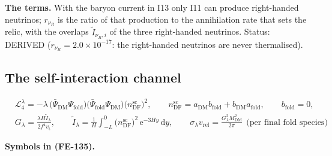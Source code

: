 \documentclass[
  10pt,
]{article}
\begin{document}
\textbf{The terms.} With the baryon current in I13 only I11 can produce
right-handed neutrinos; \(r_{\nu_R}\) is the ratio of that production to
the annihilation rate that sets the relic, with the overlaps
\(\tilde I_{\nu_R,i}\) of the three right-handed neutrinos. Status:
DERIVED (\(r_{\nu_R} = 2.0\times10^{-17}\): the right-handed neutrinos
are never thermalised).

\hypertarget{the-self-interaction-channel}{%
\subsection{The self-interaction
channel}\label{the-self-interaction-channel}}

\[
\begin{aligned}
&\mathcal{L}_4^{\lambda} =
 -\lambda\,\big(\bar\Psi_{\mathrm{DM}}\Psi_{\mathrm{fold}}\big)\big(\bar\Psi_{\mathrm{fold}}\Psi_{
 \mathrm{DM}}\big)
 \big(n^{\mathrm{sc}}_{\mathrm{DF}}\big)^2,\qquad n^{\mathrm{sc}}_{\mathrm{DF}} =
 a_{\mathrm{DM}}b_{\mathrm{fold}} + b_{\mathrm{DM}}a_{\mathrm{fold}},
 \qquad b_{\mathrm{fold}} = 0,\\
&G_\lambda = \frac{\lambda H\tilde I_\lambda}{2f^4v_{\mathrm{t}}},\qquad
 \tilde I_\lambda = \frac{1}{H}\int_{-L}^{0}\big(n^{\mathrm{sc}}_{\mathrm{DF}}\big)^2\,
 \mathrm{e}^{-3Hy}\,\mathrm{d}y,\qquad
 \sigma_\lambda v_{\mathrm{rel}} = \frac{G_\lambda^2M_{\mathrm{DM}}^2}{2\pi}\ \ \text{(per final fold
 species)}
\end{aligned} \tag{FE-135}
\]

\textbf{Symbols in (FE-135).}
\end{document}
